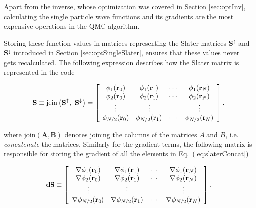 Apart from the inverse, whose optimization was covered in Section \ref{sec:optInv}, calculating the single particle wave functions and its gradients are the most expensive operations in the QMC algorithm.

Storing these function values in matrices representing the Slater matrices $\mathbf{S}^\uparrow$ and $\mathbf{S}^\downarrow$ introduced in Section \ref{sec:optSingleSlater}, ensures that these values never gets recalculated. The following expression describes how the Slater matrix is represented in the code 

\begin{equation}
\label{eq:slaterConcat}
 \mathbf{S}  \equiv \mathrm{join}\left(\mathbf{S}^\uparrow,\,\,\mathbf{S}^\downarrow\right) = \left[ \begin{array}{cccc}
\phi_1(\mathbf{r}_0)     & \phi_1(\mathbf{r}_1)     & \cdots & \phi_1(\mathbf{r}_N)       \\
\phi_2(\mathbf{r}_0)     & \phi_2(\mathbf{r}_1)     & \cdots & \phi_2(\mathbf{r}_N)       \\
\vdots          & \vdots          &        & \vdots            \\
\phi_{N/2}(\mathbf{r}_0) & \phi_{N/2}(\mathbf{r}_1) & \cdots & \phi_{N/2}(\mathbf{r}_N)   \end{array} \right],
\end{equation}

where $\mathrm{join}(\mathbf{A}, \mathbf{B})$ denotes joining the columns of the matrices $A$ and $B$, i.e. \textit{concatenate} the matrices\cite{linAlg}. Similarly for the gradient terms, the following matrix is responsible for storing the gradient of all the elements in Eq.~(\ref{eq:slaterConcat})

\begin{equation}
\label{eq:slaterDellConcat}
 \mathbf{dS} \equiv \left[ \begin{array}{cccc}
\nabla \phi_1(\mathbf{r}_0)     & \nabla \phi_1(\mathbf{r}_1)     & \cdots & \nabla \phi_1(\mathbf{r}_N)       \\
\nabla \phi_2(\mathbf{r}_0)     & \nabla \phi_2(\mathbf{r}_1)     & \cdots & \nabla \phi_2(\mathbf{r}_N)       \\
\vdots                 & \vdots                 &        & \vdots                   \\
\nabla \phi_{N/2}(\mathbf{r}_0) & \nabla \phi_{N/2}(\mathbf{r}_1) & \cdots & \nabla \phi_{N/2}(\mathbf{r}_N)   \end{array} \right].
\end{equation}

